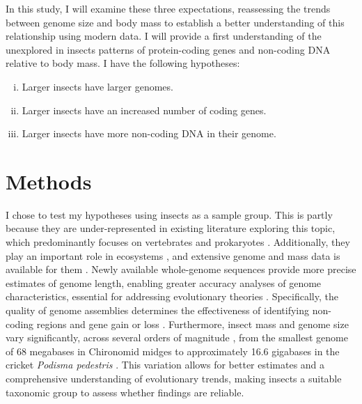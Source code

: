 \documentclass[11pt]{article}
\begin{document}
In this study, I will examine these three expectations, reassessing the trends between genome size and body mass to establish a better understanding of this relationship using modern data. I will provide a first understanding of the unexplored in insects patterns of protein-coding genes and non-coding DNA relative to body mass. I have the following hypotheses:
\vspace{-0.25cm}
\begin{enumerate}[(i)]
    \setlength\itemsep{-0.1cm}
    \item Larger insects have larger genomes.
    \item Larger insects have an increased number of coding genes.
    \item Larger insects have more non-coding DNA in their genome.
\end{enumerate}

\pagebreak
\section{Methods}
I chose to test my hypotheses using insects as a sample group. This is partly because they are under-represented in existing literature exploring this topic, which predominantly focuses on vertebrates and prokaryotes \citep{genomeandmetabolism}. Additionally, they play an important role in ecosystems \citep{role-of-insects}, and extensive genome and mass data is available for them \citep{insectbase}. Newly available whole-genome sequences provide more precise estimates of genome length, enabling greater accuracy analyses of genome characteristics, essential for addressing evolutionary theories \citep{wgs}. Specifically, the quality of genome assemblies determines the effectiveness of identifying non-coding regions and gene gain or loss \citep{telomeres}.  Furthermore, insect mass and genome size vary significantly, across several orders of magnitude \citep{massvariation}, from the smallest genome of 68 megabases in Chironomid midges to approximately 16.6 gigabases in the cricket \textit{Podisma pedestris} \citep{smallest-genome, podisma}. This variation allows for better estimates and a comprehensive understanding of evolutionary trends, making insects a suitable taxonomic group to assess whether findings are reliable.
\end{document}
